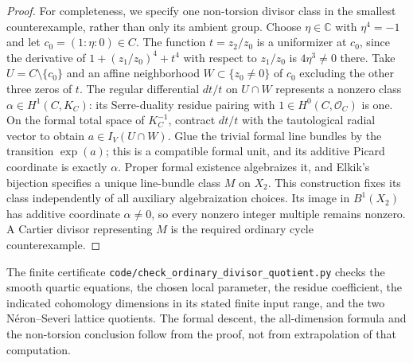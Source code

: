 \begin{proof}
For completeness, we specify one non-torsion divisor
class in the smallest counterexample, rather than only
its ambient group. Choose $\eta\in\mathbb C$ with
$\eta^4=-1$ and let $c_0=(1:\eta:0)\in C$.
The function $t=z_2/z_0$ is a uniformizer at $c_0$,
since the derivative of $1+(z_1/z_0)^4+t^4$ with respect
to $z_1/z_0$ is $4\eta^3\ne0$ there. Take
$U=C\setminus\{c_0\}$ and an affine neighborhood
$W\subset\{z_0\ne0\}$ of $c_0$ excluding the other
three zeros of $t$. The regular differential
$dt/t$ on $U\cap W$ represents a nonzero class
$\alpha\in H^1(C,K_C)$: its Serre-duality residue
pairing with $1\in H^0(C,\mathcal O_C)$ is one.
On the formal total space of $K_C^{-1}$, contract
$dt/t$ with the tautological radial vector to obtain
$a\in I_V(U\cap W)$. Glue the trivial formal line
bundles by the transition $\exp(a)$; this is a
compatible formal unit, and its additive Picard
coordinate is exactly $\alpha$. Proper formal existence
algebraizes it, and Elkik's bijection specifies a unique
line-bundle class $M$ on $X_2$. This construction fixes
its class independently of all auxiliary algebraization
choices. Its image in $B^1(X_2)$ has additive coordinate
$\alpha\ne0$, so every nonzero integer multiple remains
nonzero. A Cartier divisor representing $M$ is the
required ordinary cycle counterexample.
\end{proof}

The finite certificate
\texttt{code/check\_ordinary\_divisor\_quotient.py}
checks the smooth quartic equations, the chosen local
parameter, the residue coefficient, the indicated
cohomology dimensions in its stated finite input range,
and the two N\'eron--Severi lattice quotients. The
formal descent, the all-dimension formula and the
non-torsion conclusion follow from the proof, not
from extrapolation of that computation.
